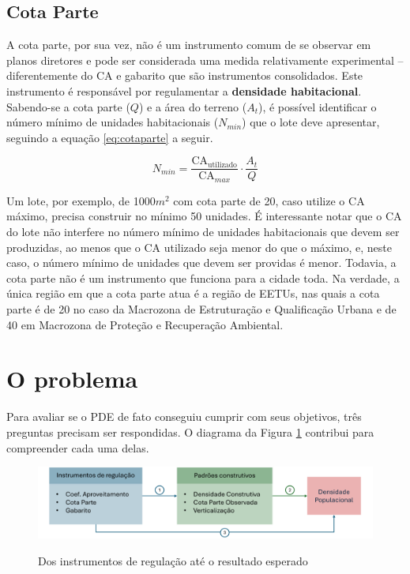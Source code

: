 \subsection*{Cota Parte}

A cota parte, por sua vez, não é um instrumento comum de se observar em planos diretores e pode ser considerada uma medida relativamente experimental -- diferentemente do CA e gabarito que são instrumentos consolidados. Este instrumento é responsável por regulamentar a \textbf{densidade habitacional}. Sabendo-se a cota parte ($Q$) e a área do terreno ($A_t$), é possível identificar o número mínimo de unidades habitacionais ($N_{min}$) que o lote deve apresentar, seguindo a equação \ref{eq:cotaparte} a seguir. 

\begin{equation}
    N_{min} = \frac{\text{CA}_{\text{utilizado}}}{\text{CA}_{max}}\cdot \frac{A_t}{Q}
    \label{eq:cotaparte}
\end{equation}

Um lote, por exemplo, de 1000$m^2$ com cota parte de 20, caso utilize o CA máximo, precisa construir no mínimo 50 unidades. É interessante notar que o CA do lote não interfere no número mínimo de unidades habitacionais que devem ser produzidas, ao menos que o CA utilizado seja menor do que o máximo, e, neste caso, o número mínimo de unidades que devem ser providas é menor. Todavia, a cota parte não é um instrumento que funciona para a cidade toda. Na verdade, a única região em que a cota parte atua é a região de EETUs, nas quais a cota parte é de 20 no caso da Macrozona de Estruturação e Qualificação Urbana e de 40 em Macrozona de Proteção e Recuperação Ambiental.

\section{O problema}
\label{sec:problema}

Para avaliar se o PDE de fato conseguiu cumprir com seus objetivos, três preguntas precisam ser respondidas. O diagrama da Figura \ref{fig:diagrama} contribui para compreender cada uma delas.

\begin{figure}[h]
    \caption{Dos instrumentos de regulação até o resultado esperado}
    \includegraphics[width = \linewidth]{figuras/desenho_proposta.pdf}
    \label{fig:diagrama}
\end{figure}

